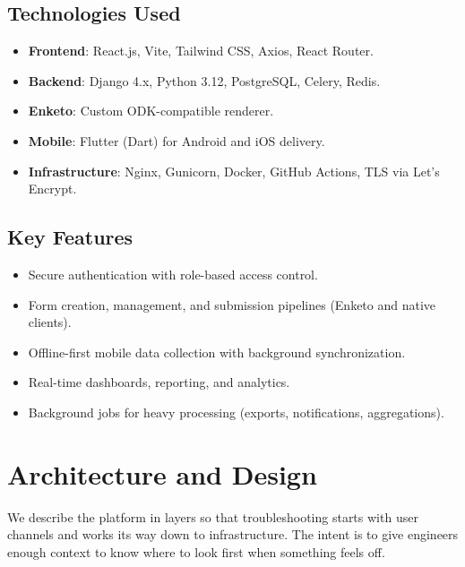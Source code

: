 \documentclass[11pt]{article}
\begin{document}
\subsection{Technologies Used}
\begin{itemize}[leftmargin=*]
  \item \textbf{Frontend}: React.js, Vite, Tailwind CSS, Axios, React Router.
  \item \textbf{Backend}: Django 4.x, Python 3.12, PostgreSQL, Celery, Redis.
  \item \textbf{Enketo}: Custom ODK-compatible renderer.
  \item \textbf{Mobile}: Flutter (Dart) for Android and iOS delivery.
  \item \textbf{Infrastructure}: Nginx, Gunicorn, Docker, GitHub Actions, TLS via Let's Encrypt.
\end{itemize}

\subsection{Key Features}
\begin{itemize}[leftmargin=*]
  \item Secure authentication with role-based access control.
  \item Form creation, management, and submission pipelines (Enketo and native clients).
  \item Offline-first mobile data collection with background synchronization.
  \item Real-time dashboards, reporting, and analytics.
  \item Background jobs for heavy processing (exports, notifications, aggregations).
\end{itemize}

\section{Architecture and Design}
\noindent We describe the platform in layers so that troubleshooting starts with user channels and works its way down to infrastructure. The intent is to give engineers enough context to know where to look first when something feels off.
\end{document}
